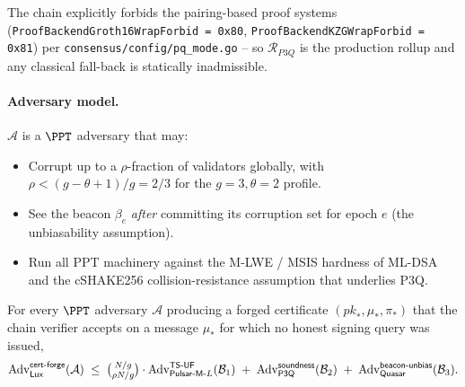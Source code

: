 The chain explicitly forbids the pairing-based proof systems
(\texttt{ProofBackendGroth16WrapForbid = 0x80},
\texttt{ProofBackendKZGWrapForbid = 0x81}) per
\texttt{consensus/config/pq\_mode.go} -- so $\mathcal{R}_{P3Q}$ is
the production rollup and any classical fall-back is statically
inadmissible.

\paragraph{Adversary model.}
$\mathcal{A}$ is a $\PPT$ adversary that may:
\begin{itemize}[leftmargin=*, itemsep=0pt]
\item Corrupt up to a $\rho$-fraction of validators globally, with
$\rho < (g - \theta + 1) / g = 2/3$ for the $g=3, \theta=2$ profile.
\item See the beacon $\beta_e$ \emph{after} committing its
corruption set for epoch $e$ (the unbiasability assumption).
\item Run all PPT machinery against the M-LWE / MSIS hardness of
ML-DSA and the cSHAKE256 collision-resistance assumption that
underlies P3Q.
\end{itemize}

\begin{theorem}
\label{thm:pulsar-grouped-sortition}
For every $\PPT$ adversary $\mathcal{A}$ producing a forged
certificate $(\mathit{pk}_*, \mu_*, \pi_*)$ that the chain verifier
accepts on a message $\mu_*$ for which no honest signing query was
issued,
\[
  \mathrm{Adv}^{\mathsf{cert\text{-}forge}}_{\mathsf{Lux}}(\mathcal{A})
  \;\le\;
  \tbinom{N/g}{\rho N / g} \cdot
  \mathrm{Adv}^{\mathsf{TS\text{-}UF}}_{\mathsf{Pulsar\text{-}M}\text{-}L}(\mathcal{B}_1)
  \;+\;
  \mathrm{Adv}^{\mathsf{soundness}}_{\mathsf{P3Q}}(\mathcal{B}_2)
  \;+\;
  \mathrm{Adv}^{\mathsf{beacon\text{-}unbias}}_{\mathsf{Quasar}}(\mathcal{B}_3).
\]
\end{theorem}

